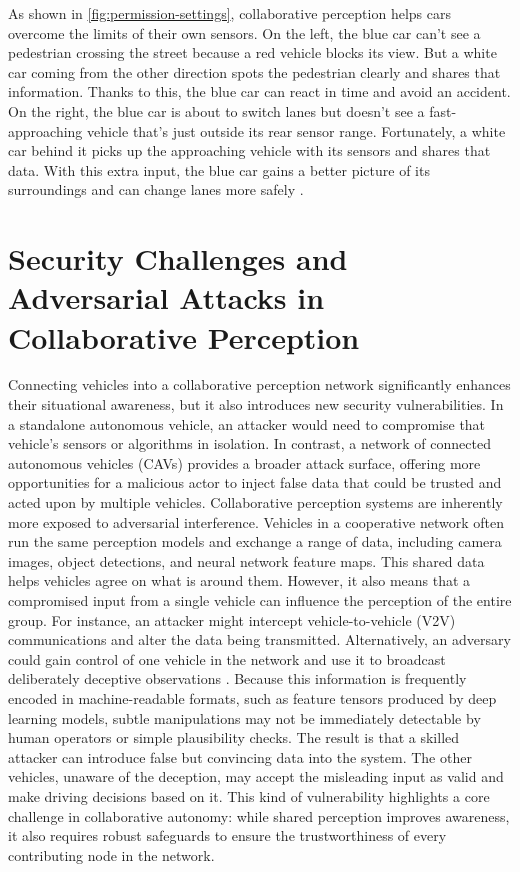 As shown in \autoref{fig:permission-settings}, collaborative perception helps cars overcome the limits of their own sensors.
On the left, the blue car can’t see a pedestrian crossing the street because a red vehicle blocks its view. But a white car coming from the other direction spots the pedestrian clearly and shares that information. Thanks to this, the blue car can react in time and avoid an accident.
On the right, the blue car is about to switch lanes but doesn’t see a fast-approaching vehicle that’s just outside its rear sensor range. Fortunately, a white car behind it picks up the approaching vehicle with its sensors and shares that data. With this extra input, the blue car gains a better picture of its surroundings and can change lanes more safely \cite{hu2025collaborativeperceptionconnectedautonomous}.

\section{Security Challenges and Adversarial Attacks in Collaborative Perception}

Connecting vehicles into a collaborative perception network significantly enhances their situational awareness, but it also introduces new security vulnerabilities.
In a standalone autonomous vehicle, an attacker would need to compromise that vehicle’s sensors or algorithms in isolation.
In contrast, a network of connected autonomous vehicles (CAVs) provides a broader attack surface, offering more opportunities for a malicious actor to inject false data that could be trusted and acted upon by multiple vehicles.
Collaborative perception systems are inherently more exposed to adversarial interference. Vehicles in a cooperative network often run the same perception models and exchange a range of data, including camera images, object detections, and neural network feature maps.
This shared data helps vehicles agree on what is around them. However, it also means that a compromised input from a single vehicle can influence the perception of the entire group.
For instance, an attacker might intercept vehicle-to-vehicle (V2V) communications and alter the data being transmitted. Alternatively, an adversary could gain control of one vehicle in the network and use it to broadcast deliberately deceptive observations \cite{zhang2023datafabricationcollaborativevehicular} \cite{wang2025cpfreezerlatencyattacksvehicular}.
Because this information is frequently encoded in machine-readable formats, such as feature tensors produced by deep learning models, subtle manipulations may not be immediately detectable by human operators or simple plausibility checks.
The result is that a skilled attacker can introduce false but convincing data into the system. The other vehicles, unaware of the deception, may accept the misleading input as valid and make driving decisions based on it.
This kind of vulnerability highlights a core challenge in collaborative autonomy: while shared perception improves awareness, it also requires robust safeguards to ensure the trustworthiness of every contributing node in the network.

